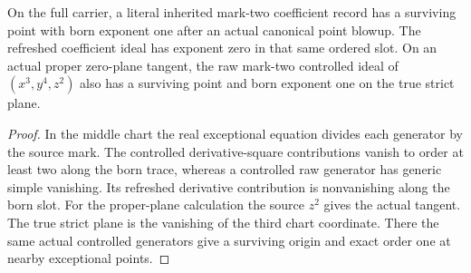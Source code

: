 \begin{theorem}
\label{hir:g1-actual-born-submark-coefficients}
\leanok
On the full carrier, a literal inherited mark-two coefficient
record has a surviving point with born exponent one after an
actual canonical point blowup. The refreshed coefficient ideal
has exponent zero in that same ordered slot. On an actual proper
zero-plane tangent, the raw mark-two controlled ideal of
$(x^3,y^4,z^2)$ also has a surviving point and born exponent one
on the true strict plane.
\end{theorem}
\begin{proof}
In the middle chart the real exceptional equation divides each
generator by the source mark. The controlled derivative-square
contributions vanish to order at least two along the born trace,
whereas a controlled raw generator has generic simple vanishing.
Its refreshed derivative contribution is nonvanishing along the
born slot. For the proper-plane calculation the source $z^2$ gives
the actual tangent. The true strict plane is the vanishing of the
third chart coordinate. There the same actual controlled
generators give a surviving origin and exact order one at
nearby exceptional points.
\end{proof}

